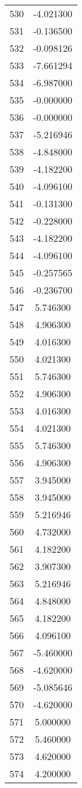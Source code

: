 \documentclass[12pt]{article}
\begin{document}
\begin{longtable}{@{}cc@{}}
530 & -4.021300 \\
531 & -0.136500 \\
532 & -0.098126 \\
533 & -7.661294 \\
534 & -6.987000 \\
535 & -0.000000 \\
536 & -0.000000 \\
537 & -5.216946 \\
538 & -4.848000 \\
539 & -4.182200 \\
540 & -4.096100 \\
541 & -0.131300 \\
542 & -0.228000 \\
543 & -4.182200 \\
544 & -4.096100 \\
545 & -0.257565 \\
546 & -0.236700 \\
547 & 5.746300 \\
548 & 4.906300 \\
549 & 4.016300 \\
550 & 4.021300 \\
551 & 5.746300 \\
552 & 4.906300 \\
553 & 4.016300 \\
554 & 4.021300 \\
555 & 5.746300 \\
556 & 4.906300 \\
557 & 3.945000 \\
558 & 3.945000 \\
559 & 5.216946 \\
560 & 4.732000 \\
561 & 4.182200 \\
562 & 3.907300 \\
563 & 5.216946 \\
564 & 4.848000 \\
565 & 4.182200 \\
566 & 4.096100 \\
567 & -5.460000 \\
568 & -4.620000 \\
569 & -5.085646 \\
570 & -4.620000 \\
571 & 5.000000 \\
572 & 5.460000 \\
573 & 4.620000 \\
574 & 4.200000 \\

\end{longtable}
\end{document}
